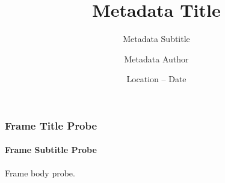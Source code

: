 \documentclass[12pt,aspectratio=169]{beamer}
\title{Metadata Title}
\subtitle{Metadata Subtitle}
\author{Metadata Author}
\institute{Institute Probe}
\date{Location -- Date}
\begin{document}
\frame{\titlepage}

\begin{frame}
  \frametitle{Frame Title Probe}
  \framesubtitle{Frame Subtitle Probe}
  Frame body probe.
\end{frame}
\end{document}
